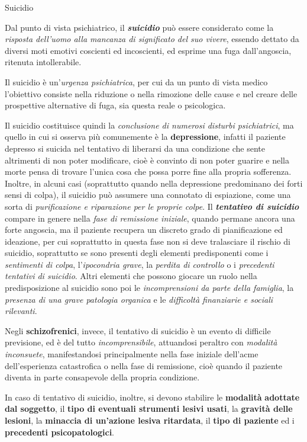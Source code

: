 \documentclass[]{article}
\date{}
\begin{document}
Suicidio

Dal punto di vista psichiatrico, il \textbf{\emph{suicidio}} può essere
considerato come la \emph{risposta dell'uomo alla mancanza di
significato del suo vivere}, essendo dettato da diversi moti emotivi
coscienti ed incoscienti, ed esprime una fuga dall'angoscia, ritenuta
intollerabile.

Il suicidio è un'\emph{urgenza psichiatrica}, per cui da un punto di
vista medico l'obiettivo consiste nella riduzione o nella rimozione
delle cause e nel creare delle prospettive alternative di fuga, sia
questa reale o psicologica.

Il suicidio costituisce quindi la \emph{conclusione di numerosi disturbi
psichiatrici}, ma quello in cui si osserva più comunemente è la
\textbf{depressione}, infatti il paziente depresso si suicida nel
tentativo di liberarsi da una condizione che sente altrimenti di non
poter modificare, cioè è convinto di non poter guarire e nella morte
pensa di trovare l'unica cosa che possa porre fine alla propria
sofferenza. Inoltre, in alcuni casi (soprattutto quando nella
depressione predominano dei forti sensi di colpa), il suicidio può
assumere una connotato di espiazione, come una sorta di
\emph{purificazione e riparazione per le proprie colpe}. Il
\textbf{\emph{tentativo di suicidio}} compare in genere nella \emph{fase
di remissione iniziale}, quando permane ancora una forte angoscia, ma il
paziente recupera un discreto grado di pianificazione ed ideazione, per
cui soprattutto in questa fase non si deve tralasciare il rischio di
suicidio, soprattutto se sono presenti degli elementi predisponenti come
i \emph{sentimenti di colpa}, l'\emph{ipocondria grave}, la
\emph{perdita di controllo} o i \emph{precedenti tentativi di suicidio}.
Altri elementi che possono giocare un ruolo nella predisposizione al
suicidio sono poi le \emph{incomprensioni da parte della famiglia}, la
\emph{presenza di una grave patologia organica} e le \emph{difficoltà
finanziarie e sociali rilevanti}.

Negli \textbf{schizofrenici}, invece, il tentativo di suicidio è un
evento di difficile previsione, ed è del tutto \emph{incomprensibile},
attuandosi peraltro con \emph{modalità inconsuete}, manifestandosi
principalmente nella fase iniziale dell'acme dell'esperienza
catastrofica o nella fase di remissione, cioè quando il paziente diventa
in parte consapevole della propria condizione.

In caso di tentativo di suicidio, inoltre, si devono stabilire le
\textbf{modalità} \textbf{adottate dal soggetto}, il \textbf{tipo di
eventuali strumenti lesivi usati}, la \textbf{gravità delle lesioni}, la
\textbf{minaccia di un'azione lesiva ritardata}, il \textbf{tipo di
paziente} ed i \textbf{precedenti psicopatologici}.
\end{document}
